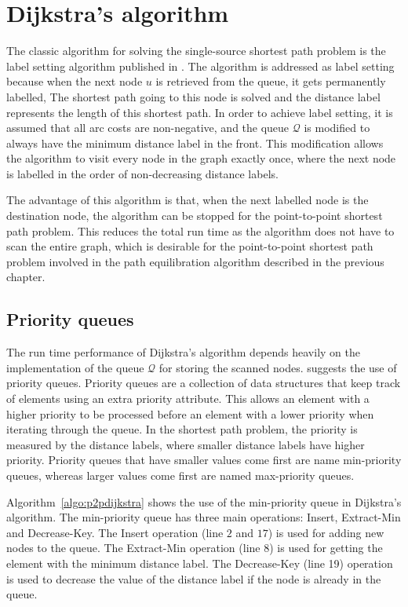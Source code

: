 \section{Dijkstra's algorithm} \label{sec:dijkstra}
The classic algorithm for solving the single-source shortest path problem is the label setting algorithm published in \citet{Dijkstra}.
The algorithm is addressed as label setting because when the next node $u$ is retrieved from the queue,
it gets permanently labelled,
The shortest path going to this node is solved and 
the distance label represents the length of this shortest path.
In order to achieve label setting, 
it is assumed that all arc costs are non-negative,
and the queue $\mathcal{Q}$ is modified to always have the minimum distance label in the front.
This modification allows the algorithm to visit every node in the graph exactly once,
where the next node is labelled in the order of non-decreasing distance labels.

The advantage of this algorithm is that,
when the next labelled node is the destination node,
the algorithm can be stopped for the point-to-point shortest path problem.
This reduces the total run time as the algorithm does not have to scan the entire graph,
which is desirable for the point-to-point shortest path problem involved in the path equilibration algorithm described in the previous chapter.

\subsection{Priority queues} \label{sec:pq}
The run time performance of Dijkstra's algorithm depends heavily on the implementation of the queue $\mathcal{Q}$ for storing the scanned nodes.
\citet{Cormen} suggests the use of priority queues.
Priority queues are a collection of data structures
that keep track of elements using an extra priority attribute.
This allows an element with a higher priority to be processed before an element with a lower priority when iterating through the queue.
In the shortest path problem, the priority is measured by the distance labels, where smaller distance labels have higher priority.
Priority queues that have smaller values come first are name min-priority queues, whereas larger values come first are named max-priority queues.

Algorithm~\ref{algo:p2pdijkstra} shows the use of the min-priority queue in Dijkstra's algorithm.
The min-priority queue has three main operations: Insert, Extract-Min and Decrease-Key.
The Insert operation (line $2$ and $17$) is used for adding new nodes to the queue.
The Extract-Min operation (line 8) is used for getting the element with the minimum distance label.
The Decrease-Key (line 19) operation is used to decrease the value of the distance label if the node is already in the queue.

